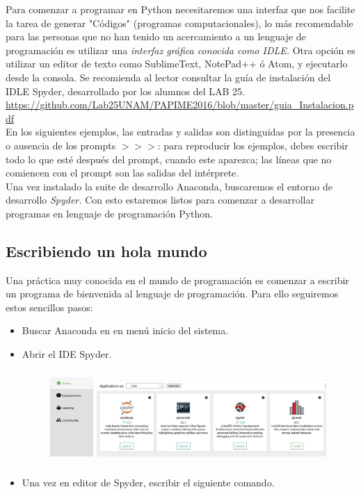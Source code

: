 \documentclass[a4paper, openright, 12pt]{article}
\begin{document}
    Para comenzar a programar en Python necesitaremos una interfaz que nos facilite la tarea de generar "Códigos" (programas computacionales), lo más recomendable para las personas que no han tenido un acercamiento a un lenguaje de programación es utilizar una \textit{interfaz gráfica conocida como IDLE.} Otra opción es utilizar un editor de texto como SublimeText, NotePad++ ó Atom, y ejecutarlo desde la consola. Se recomienda al lector consultar la guía de instalación del IDLE Spyder, desarrollado por los alumnos del LAB 25. \url{https://github.com/Lab25UNAM/PAPIME2016/blob/master/guia_Instalacion.pdf}\\

    En  los  siguientes  ejemplos,  las  entradas  y  salidas  son distinguidas  por  la  presencia  o  ausencia  de  los prompts \textbf{$>>>$}:  para  reproducir  los  ejemplos,  debes  escribir  todo  lo  que  esté  después  del prompt, cuando este aparezca; las líneas que no comiencen con el prompt son las salidas del intérprete.\\

    Una vez instalado la suite de desarrollo Anaconda, buscaremos el entorno de desarrollo \textit{Spyder.} Con esto estaremos listos para comenzar a desarrollar programas en lenguaje de programación Python.\\

    \subsection{Escribiendo un hola mundo}

    Una práctica muy conocida en el mundo de programación es comenzar a escribir un programa de bienvenida al lenguaje de programación. Para ello seguiremos estos sencillos pasos:

    \begin{itemize}
      \item{Buscar Anaconda en en menú inicio del sistema.}
      \item{Abrir el IDE Spyder.}
        \begin{figure}[ht]
            \centering
            \includegraphics[width=10.5cm, height=3.5cm]{w_11.jpg}
        \end{figure}
      \item{Una vez en editor de Spyder, escribir el siguiente comando.}
    \end{itemize}
\end{document}
